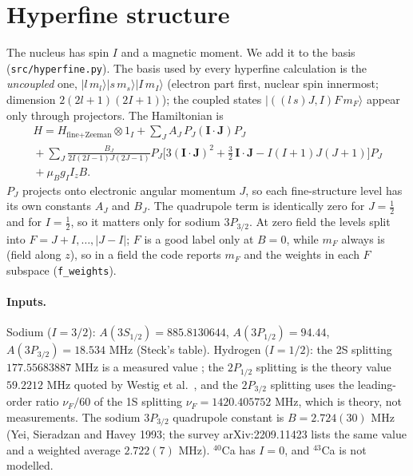 \section{Hyperfine structure}
The nucleus has spin $I$ and a magnetic moment. We add it to the basis (\texttt{src/hyperfine.py}). The basis used by every hyperfine calculation is the \emph{uncoupled} one, $|l\,m_l\rangle|s\,m_s\rangle|I\,m_I\rangle$ (electron part first, nuclear spin innermost; dimension $2(2l+1)(2I+1)$); the coupled states $|((l\,s)J,I)F\,m_F\rangle$ appear only through projectors. The Hamiltonian is
\begin{multline}
H = H_\text{fine+Zeeman}\otimes 1_I + \sum_J A_J\, P_J(\mathbf I\cdot\mathbf J)P_J\\
{}+ \sum_J \frac{B_J}{2I(2I-1)J(2J-1)}P_J\Big[3(\mathbf I\cdot\mathbf J)^2+\tfrac32\,\mathbf I\cdot\mathbf J-I(I+1)J(J+1)\Big]P_J\\
{}+ \mu_B g_I I_z B .
\end{multline}
$P_J$ projects onto electronic angular momentum $J$, so each fine-structure level has its own constants $A_J$ and $B_J$. The quadrupole term is identically zero for $J=\tfrac12$ and for $I=\tfrac12$, so it matters only for sodium $3P_{3/2}$. At zero field the levels split into $F=J+I,\dots,|J-I|$; $F$ is a good label only at $B=0$, while $m_F$ always is (field along $z$), so in a field the code reports $m_F$ and the weights in each $F$ subspace (\texttt{f\_weights}).

\paragraph{Inputs.} Sodium ($I=3/2$): $A(3S_{1/2})=885.8130644$, $A(3P_{1/2})=94.44$, $A(3P_{3/2})=18.534$ MHz (Steck's table). Hydrogen ($I=1/2$): the 2S splitting
$177.55683887$ MHz is a measured value \cite{prl2s}; the $2P_{1/2}$ splitting is the theory value $59.2212$ MHz quoted by Westig et al.\ \cite{westig}, and the $2P_{3/2}$ splitting uses the leading-order ratio $\nu_F/60$ of the 1S splitting $\nu_F=1420.405752$ MHz, which is theory, not measurements.
The sodium $3P_{3/2}$ quadrupole constant is $B=2.724(30)$ MHz (Yei, Sieradzan and Havey 1993; the survey arXiv:2209.11423 lists the same value and a weighted average $2.722(7)$ MHz). $^{40}$Ca has $I=0$, and $^{43}$Ca is not modelled.

